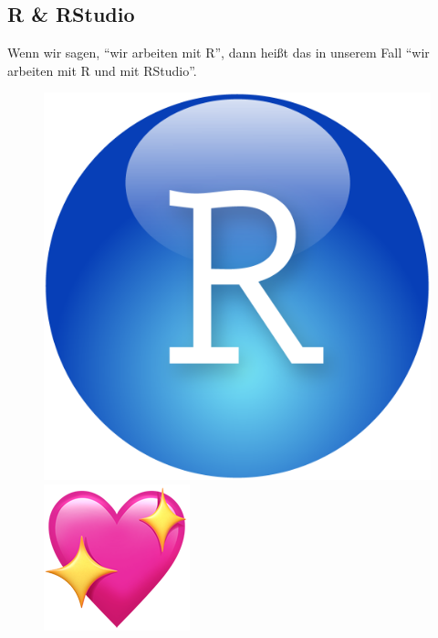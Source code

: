 \documentclass[
  a4paper,
]{scrbook}
\theoremstyle{definition}
\theoremstyle{definition}
\theoremstyle{definition}
\theoremstyle{remark}
\begin{document}
\subsection{R \& RStudio}\label{r-rstudio}

Wenn wir sagen, ``wir arbeiten mit R'', dann heißt das in unserem Fall
``wir arbeiten mit R und mit RStudio''.

\begin{figure}

\begin{minipage}{0.40\linewidth}

\includegraphics{img/R-logo.png}

\end{minipage}%
%
\begin{minipage}{0.20\linewidth}

\includegraphics{img/sparkling_heart.png}


\end{minipage}
\end{figure}
\end{document}
